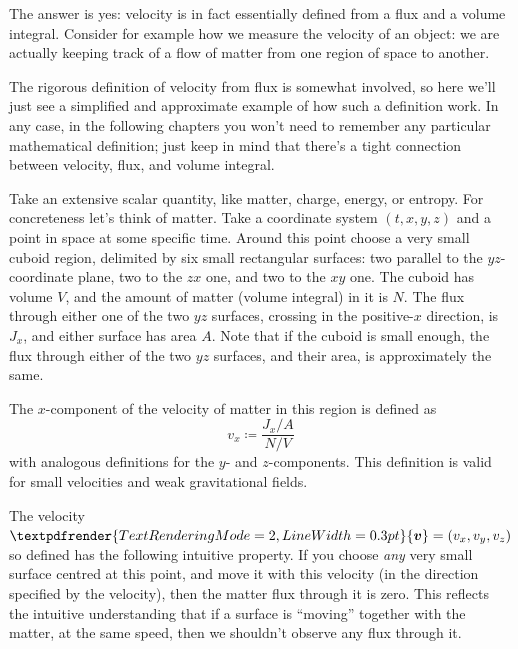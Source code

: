 \documentclass[a4paper,12pt,%
onecolumn,oneside,titlepage,%
british%
]{memoir}
\renewcommand*{\bm}[1]{\textpdfrender{TextRenderingMode=2,LineWidth=0.3pt}{\boldsymbol{#1}}}
\newcommand*{\defd}{\coloneqq}
\renewcommand*{\|}[1][]{\nonscript\:#1\vert\nonscript\:\mathopen{}}
\newcommand*{\yv}{\bm{v}}
\newcommand*{\yN}{N}
\newcommand*{\yJ}{J}
\begin{document}
The answer is yes: velocity is in fact essentially defined from a flux and a volume integral. Consider for example how we measure the velocity of an object: we are actually keeping track of a flow of matter from one region of space to another.

The rigorous definition of velocity from flux is somewhat involved, so here we'll just see a simplified and approximate example of how such a definition work. In any case, in the following chapters you won't need to remember any particular mathematical definition; just keep in mind that there's a tight connection between velocity, flux, and volume integral.

Take an extensive scalar quantity, like matter, charge, energy, or entropy. For concreteness let's think of matter. Take a coordinate system $(t,x,y,z)$ and a point in space at some specific time. Around this point choose a very small cuboid region, delimited by six small rectangular surfaces: two parallel to the $yz$-coordinate plane, two to the $zx$ one, and two to the $xy$ one. The cuboid has volume $V$, and the amount of matter (volume integral) in it is $\yN$. The flux through either one of the two $yz$ surfaces, crossing in the positive-$x$ direction, is $\yJ_{x}$, and either surface has area $A$. Note that if the cuboid is small enough, the flux through either of the two $yz$ surfaces, and their area, is approximately the same.

The $x$-component of the velocity of matter in this region is defined as
\begin{equation}
  \label{eq:velocity_from_flux}
  v_{x} \defd \frac{J_{x}/A}{\yN/V}
\end{equation}
with analogous definitions for the $y$- and $z$-components.
This definition is valid for small velocities and weak gravitational fields.


The velocity $\yv=(v_{x}, v_{y}, v_{z})$ so defined has the following intuitive property. If you choose \emph{any} very small surface centred at this point, and move it with this velocity (in the direction specified by the velocity), then the matter flux through it is zero. This reflects the intuitive understanding that if a surface is \enquote{moving} together with the matter, at the same speed, then we shouldn't observe any flux through it.
\end{document}

